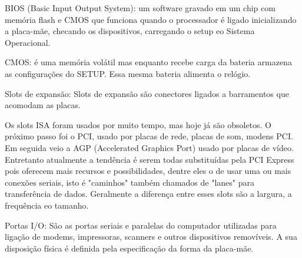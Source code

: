 \documentclass[a4paper,10pt]{article}
\begin{document}
BIOS (Basic Input Output System): um software gravado em um chip com memória flash e CMOS que funciona quando o processador é ligado inicializando a placa-mãe, checando os dispositivos, carregando o setup eo Sistema Operacional.

CMOS: é uma memória volátil mas enquanto recebe carga da bateria armazena as configurações do SETUP. Essa mesma bateria alimenta o relógio.

Slots de expansão: Slots de expansão são conectores ligados a barramentos que acomodam as placas.


Os slots ISA foram usados por muito tempo, mas hoje já são obsoletos. O próximo passo foi o PCI, usado por placas de rede, placas de som, modens PCI. Em seguida veio a AGP (Accelerated Graphics Port) usado por placas de vídeo. Entretanto atualmente a tendência é serem todas substituídas pela PCI Express pois oferecem mais recursos e possibilidades, dentre eles o de usar uma ou mais conexões seriais, isto é "caminhos" também chamados de "lanes" para transferência de dados. Geralmente a diferença entre esses slots são a largura, a frequência eo tamanho.

Portas I/O: São as portas seriais e paralelas do computador utilizadas para ligação de modems, impressoras, scanners e outros dispositivos removíveis. A sua disposição física é definida pela especificação da forma da placa-mãe.
\end{document}
